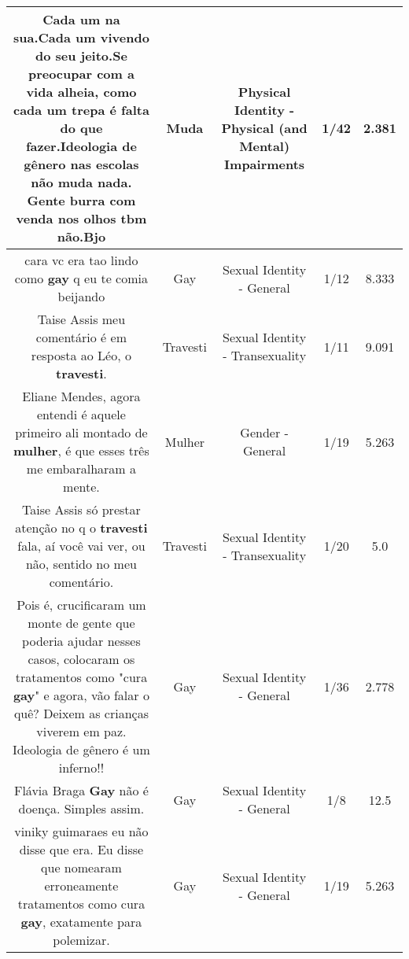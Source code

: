 \documentclass[11pt]{article}
\newlength\mylength
\begin{document}
\begin{center}
\begin{longtable}{|C{.65\mylength}|C{.30\mylength}|C{.12\mylength}|C{.12\mylength}|C{.12\mylength}|}
  \small Cada um na sua.Cada um vivendo do seu jeito.Se preocupar com a vida alheia, como cada um trepa é falta do que fazer.Ideologia de gênero nas escolas não \textbf{muda} nada. Gente burra com venda nos olhos tbm não.Bjo\normalsize   & Muda & Physical Identity - Physical (and Mental) Impairments & 1/42 & 2.381 \\  \hline
  \small cara vc era tao lindo como \textbf{gay} q eu te comia beijando\normalsize   & Gay & Sexual Identity - General & 1/12 & 8.333 \\  \hline
  \small Taise Assis meu comentário é em resposta ao Léo, o \textbf{travesti}.\normalsize   & Travesti & Sexual Identity - Transexuality & 1/11 & 9.091 \\  \hline
  \small Eliane Mendes, agora entendi é aquele primeiro ali montado de \textbf{mulher}, é que esses três me embaralharam a mente.\normalsize   & Mulher & Gender - General & 1/19 & 5.263 \\  \hline
  \small Taise Assis só prestar atenção no q o \textbf{travesti} fala, aí você vai ver, ou não, sentido no meu comentário.\normalsize   & Travesti & Sexual Identity - Transexuality & 1/20 & 5.0 \\  \hline
  \small Pois é, crucificaram um monte de gente que poderia ajudar nesses casos, colocaram os tratamentos como "cura \textbf{gay}" e agora, vão falar o quê? Deixem as crianças viverem em paz. Ideologia de gênero é um inferno!!\normalsize   & Gay & Sexual Identity - General & 1/36 & 2.778 \\  \hline
  \small Flávia Braga \textbf{Gay} não é doença. Simples assim.\normalsize   & Gay & Sexual Identity - General & 1/8 & 12.5 \\  \hline
  \small viniky guimaraes eu não disse que era. Eu disse que nomearam erroneamente tratamentos como cura \textbf{gay}, exatamente para polemizar.\normalsize   & Gay & Sexual Identity - General & 1/19 & 5.263 \\  \hline

\end{longtable}
\end{center}
\end{document}
